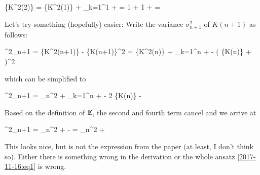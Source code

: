 \bee
\mE\{K^2(2)\} = \mE\{K^2(1)\} +  \sum_{k=1}^1  +  = 1 + 1  +  = 
\eee

Let's try something (hopefully) easier: Write the variance $\sigma^2_{n+1}$ of $K(n+1)$ as follows:

\bee
\sigma^2_{n+1} = \mE\{K^2(n+1)\} - \mE\{K(n+1)\}^2 = \mE\{K^2(n)\} +  \sum_{k=1}^n  +  - \left( \mE\{K(n)\} +  \right)^2
\eee

which can be simplified to

\bee
\sigma^2_{n+1} = \sigma_n^2 +  \sum_{k=1}^n  +  - 2  \mE\{K(n)\} - 
\eee

Based on the definition of $\mathbb{E}$, the second and fourth term cancel and we arrive at

\bee
\sigma^2_{n+1} = \sigma_n^2 +  -  = \sigma_n^2 + 
\eee

This looks nice, but is not the expression from the paper (at least, I don't think so). Either there is something wrong in the derivation or the whole ansatz \eqref{2017-11-16:eq1} is wrong.
